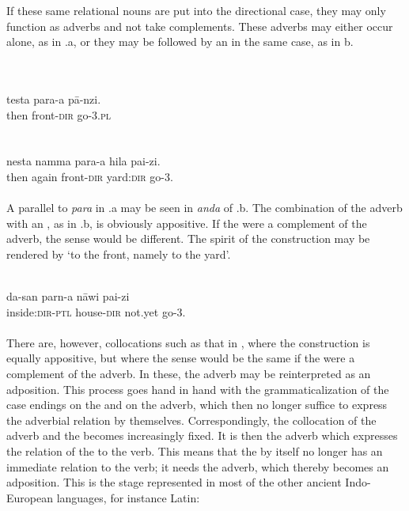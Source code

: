 
\noindent If these same relational nouns are put into the directional case, they may only function as adverbs and not take complements. These adverbs may either occur alone, as in .a, or they may be followed by an \np in the same case, as in b.

\ea\label{ex:E69}
\langinfo{\LangHitt}{}{} \\
 \ea {}\\
 \gll  testa  para-a  p\=a-nzi.\\
  then  front-\textsc{dir}  go-3.\textsc{pl}\\
\\
\ex {}\\
\gll  nesta  namma  para-a  hila  pai-zi.\\
  then  again front-\textsc{dir}  yard:\textsc{dir}  go-3.\glsg\\
\\
\z
\z
\noindent  A parallel to \textit{para} in .a may be seen in \textit{anda} of .b. The combination of the adverb with an \np, as in .b, is obviously appositive. If the \np were a complement of the adverb, the sense would be different. The spirit of the construction may be rendered by ‘to the front, namely to the yard’.

\ea\label{ex:E70} 
\\
 \gll da-san  parn-a  n\=awi  pai-zi\\
 inside:\textsc{dir}-\textsc{ptl}  house-\textsc{dir}  not.yet  go-3.\glsg\\
\\
\z
\noindent There are, however, collocations such as that in , where the construction is equally appositive, but where the sense would be the same if the \np were a complement of the adverb. In these, the adverb may be reinterpreted as an adposition. This process goes hand in hand with the grammaticalization of the case endings on the \np and on the adverb, which then no longer suffice to express the adverbial relation by themselves.\label{page100b} Correspondingly, the collocation of the adverb and the \np becomes increasingly fixed. It is then the adverb which expresses the relation of the \np to the verb. This means that the \np by itself no longer has an immediate relation to the verb; it needs the adverb, which thereby becomes an adposition. This is the stage represented in most of the other ancient Indo-European languages, for instance Latin:

